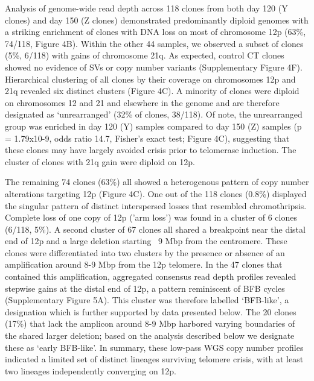 \documentclass[phd,tocprelim]{cornell}
\begin{document}
Analysis of genome-wide read depth across 118 clones from both day 120 (Y clones) and day 150 (Z clones) demonstrated predominantly diploid genomes with a striking enrichment of clones with DNA loss on most of chromosome 12p (63\%, 74/118, Figure 4B). Within the other 44 samples, we observed a subset of clones (5\%, 6/118) with gains of chromosome 21q. As expected, control CT clones showed no evidence of SVs or copy number variants (Supplementary Figure 4F). Hierarchical clustering of all clones by their coverage on chromosomes 12p and 21q revealed six distinct clusters (Figure 4C). A minority of clones were diploid on chromosomes 12 and 21 and elsewhere in the genome and are therefore designated as ‘unrearranged’ (32\% of clones, 38/118). Of note, the unrearranged group was enriched in day 120 (Y) samples compared to day 150 (Z) samples (p = 1.79x10-9, odds ratio 14.7, Fisher’s exact test; Figure 4C), suggesting that these clones may have largely avoided crisis prior to telomerase induction. The cluster of clones with 21q gain were diploid on 12p.

The remaining 74 clones (63\%) all showed a heterogenous pattern of copy number alterations targeting 12p (Figure 4C). One out of the 118 clones (0.8\%) displayed the singular pattern of distinct interspersed losses that resembled chromothripsis. Complete loss of one copy of 12p ('arm loss') was found in a cluster of 6 clones (6/118, 5\%). A second cluster of 67 clones all shared a breakpoint near the distal end of 12p and a large deletion starting ~9 Mbp from the centromere. These clones were differentiated into two clusters by the presence or absence of an amplification around 8-9 Mbp from the 12p telomere. In the 47 clones that contained this amplification, aggregated consensus read depth profiles revealed stepwise gains at the distal end of 12p, a pattern reminiscent of BFB cycles (Supplementary Figure 5A). This cluster was therefore labelled ‘BFB-like’, a designation which is further supported by data presented below. The 20 clones (17\%) that lack the amplicon around 8-9 Mbp harbored varying boundaries of the shared larger deletion; based on the analysis described below we designate these as ‘early BFB-like’. In summary, these low-pass WGS copy number profiles indicated a limited set of distinct lineages surviving telomere crisis, with at least two lineages independently converging on 12p.
\end{document}
